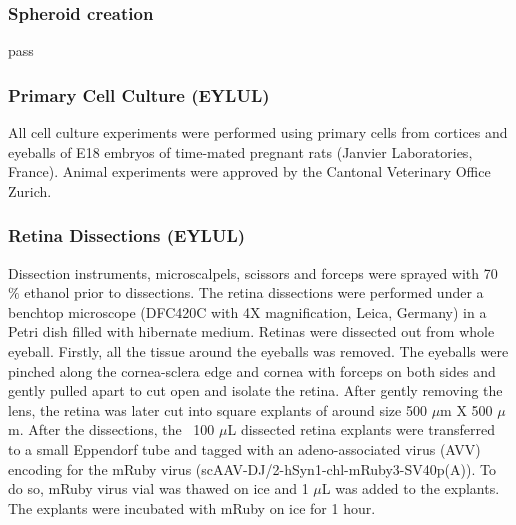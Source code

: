 \subsubsection{Spheroid creation}
pass



\subsubsection{Primary Cell Culture (EYLUL)}
All cell culture experiments were performed using primary cells from cortices
and eyeballs of E18 embryos of time-mated pregnant rats (Janvier Laboratories,
France). Animal experiments were approved by the Cantonal Veterinary Office
Zurich.


\subsubsection{Retina Dissections (EYLUL)} 
 Dissection instruments, microscalpels, scissors and forceps were sprayed with
 70 $\%$ ethanol prior to dissections. The retina dissections were performed
 under a benchtop microscope (DFC420C with 4X magnification, Leica, Germany) in
 a Petri dish filled with hibernate medium. Retinas were dissected out from
 whole eyeball. Firstly, all the tissue around the eyeballs was removed. The
 eyeballs were pinched along the cornea-sclera edge and cornea with forceps on
 both sides and gently pulled apart to cut open and isolate the retina. After
 gently removing the lens, the retina was later cut into square explants of
 around size 500 $\mu$m X 500 $\mu$m. After the dissections, the ~100 $\mu$L
 dissected retina explants were transferred to a small Eppendorf tube and tagged
 with an adeno-associated virus (AVV) encoding for the mRuby virus
 (scAAV-DJ/2-hSyn1-chl-mRuby3-SV40p(A)). To do so, mRuby virus vial was thawed
 on ice and 1 $\mu$L was added to the explants. The explants were incubated with
 mRuby on ice for 1 hour.


